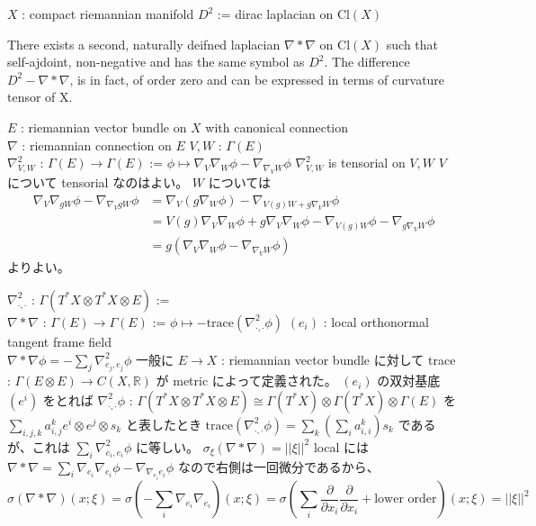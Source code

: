 \begin{When}
\itemwhen \Fix \(X\) : compact riemannian manifold
\itemwhen \Let \(D^2\) := dirac laplacian on \(\text{Cl}(X)\)
\end{When}

There exists a second, naturally deifned laplacian \(\nabla * \nabla\) on \(\text{Cl}(X)\) such that self-ajdoint, non-negative and has the same symbol as \(D^2\). 
The difference \(D^2 - \nabla * \nabla\), is in fact, of order zero and can be expressed in terms of curvature tensor of X.

\begin{Definition}
\itemwhen
  \Fix \(E\) : riemannian vector bundle on \(X\) with canonical connection \\
  \Fix \(\nabla\) : riemannian connection on \(E\)
\itemdefi
  \For \(V,W\) : \(\Gamma(E)\) \\
  \Define \(\nabla_{V,W}^2\) : \(\Gamma(E) \to \Gamma(E)\) := \(\phi \mapsto \nabla_V \nabla_W \phi - \nabla_{\nabla_V W} \phi\)
\itemprop
  \(\nabla_{V,W}^2\) is tensorial on \(V , W\)
\itemprof
  \(V\) について tensorial なのはよい。 \(W\) については
  \begin{align*}
    \nabla_V \nabla_{g W} \phi - \nabla_{\nabla_V g W} \phi
    &= \nabla_V (g \nabla_W \phi) - \nabla_{V(g) W + g \nabla_V W} \phi \\
    &= V(g) \nabla_V \nabla_W \phi + g \nabla_V \nabla_W \phi - \nabla_{V(g) W} \phi - \nabla_{g \nabla_V W} \phi \\
    &= g (\nabla_V \nabla_W \phi - \nabla_{\nabla_V W} \phi)
  \end{align*}
  よりよい。
\end{Definition}

\begin{Definition}
\itemdefi
  \Define \(\nabla_{\cdot , \cdot}^2\) : \(\Gamma(T^*X \otimes T^*X \otimes E)\) :=  \\
  \Define \(\nabla * \nabla\) : \(\Gamma(E) \to \Gamma(E)\) := \(\phi \mapsto - \text{trace}(\nabla_{\cdot , \cdot }^2 \phi)\)
\itemprop
  \For \((e_i)\) : local orthonormal tangent frame field \\
  \Then \(\nabla*\nabla \phi = - \sum_j \nabla_{e_j , e_j}^2\phi\)
\itemprof
  一般に \(E \to X\) : riemannian vector bundle に対して trace : \(\Gamma(E \otimes E) \to C(X , \mathbb{R})\) が metric によって定義された。
  \((e_i)\) の双対基底 \((e^i)\) をとれば \(\nabla_{\cdot , \cdot}^2 \phi\) : \(\Gamma(T^*X \otimes T^*X \otimes E) \cong \Gamma(T^*X) \otimes \Gamma(T^*X) \otimes \Gamma(E)\) を \(\sum_{i,j,k} a^k_{i,j} e^i \otimes e^j \otimes s_k\) と表したとき \(\text{trace}(\nabla_{\cdot , \cdot }^2 \phi) = \sum_{k} (\sum_i a^k_{i,i}) s_k\) であるが、これは \(\sum_i \nabla_{e_i , e_i}^2 \phi\) に等しい。
\itemprop
  \Then \(\sigma_{\xi}(\nabla * \nabla) = || \xi || ^2\)
\itemprof
  local には \(\nabla * \nabla = \sum_i \nabla_{e_i} \nabla_{e_i} \phi - \nabla_{\nabla_{e_i} e_i} \phi\) なので右側は一回微分であるから、
  \[\sigma(\nabla * \nabla)(x ; \xi) = \sigma(- \sum_i \nabla_{e_i} \nabla_{e_i})(x ; \xi) = \sigma(\sum_i \frac{\partial}{\partial x_i} \frac{\partial}{\partial x_i} + \text{lower order})(x ; \xi) = || \xi ||^2\]
\end{Definition}

